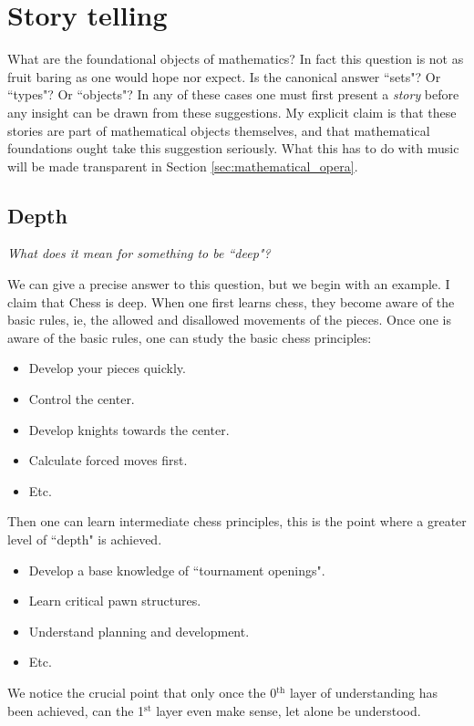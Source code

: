 \documentclass[12pt]{book}
\theoremstyle{plain}
\theoremstyle{definition}
\begin{document}
\chapter{Story telling}
What are the foundational objects of mathematics? In fact this question is not as fruit baring as one would hope nor expect. Is the canonical answer ``sets"? Or ``types"? Or ``objects"? In any of these cases one must first present a \emph{story} before any insight can be drawn from these suggestions. My explicit claim is that these stories are part of mathematical objects themselves, and that mathematical foundations ought take this suggestion seriously. What this has to do with music will be made transparent in Section \ref{sec:mathematical_opera}.

\section{Depth}
\begin{center}
	\emph{What does it mean for something to be ``deep"?}
\end{center}
We can give a precise answer to this question, but we begin with an example. I claim that Chess is deep. When one first learns chess, they become aware of the basic rules, ie, the allowed and disallowed movements of the pieces. Once one is aware of the basic rules, one can study the basic chess principles:
\begin{itemize}
	\item Develop your pieces quickly.
	\item Control the center.
	\item Develop knights towards the center.
	\item Calculate forced moves first.
	\item Etc.
\end{itemize}
Then one can learn intermediate chess principles, this is the point where a greater level of ``depth" is achieved.
\begin{itemize}
	\item Develop a base knowledge of ``tournament openings".
	\item Learn critical pawn structures.
	\item Understand planning and development.
	\item Etc.
\end{itemize}
We notice the crucial point that only once the 0$^{\text{th}}$ layer of understanding has been achieved, can the 1$^{\text{st}}$ layer even make sense, let alone be understood.
\end{document}
